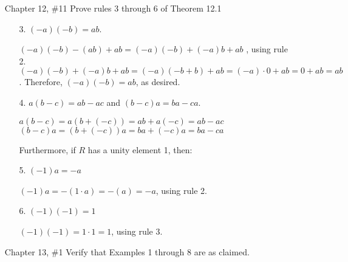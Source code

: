 \documentclass{article}
\begin{document}
\begin{enumerate}
    \item[Chapter 12, \#11] Prove rules 3 through 6 of Theorem 12.1
    
    \begin{enumerate}
        \item[3.] $(-a)(-b) = ab$.
        \begin{flushleft}
        $(-a)(-b)-(ab)+ab = (-a)(-b) + (-a)b + ab$ , using rule 2. $(-a)(-b) + (-a)b + ab = (-a)(-b+b)+ab = (-a)\cdot 0 + ab = 0 + ab = ab$. \newline
        Therefore, $(-a)(-b) = ab$, as desired.
        \end{flushleft}
        \item[4.] $a(b-c) = ab - ac$ and $(b-c)a = ba - ca$.
        \begin{flushleft}
        $a(b-c) = a(b + (-c)) = ab + a(-c) = ab - ac$\newline
        $(b-c)a = (b + (-c))a = ba + (-c)a = ba - ca$
        \end{flushleft}
        Furthermore, if $R$ has a unity element 1, then:
        \item[5.] $(-1)a = -a$
        \begin{flushleft}
        $(-1)a = -(1 \cdot a) = -(a) = -a$, using rule 2.
        \end{flushleft}
        \item[6.] $(-1)(-1) = 1$
        \begin{flushleft}
        $(-1)(-1) = 1\cdot1 = 1$, using rule 3.
        \end{flushleft}
    \end{enumerate}
    
    \item[Chapter 13, \#1] Verify that Examples 1 through 8 are as claimed.
    

\end{enumerate}
\end{document}
